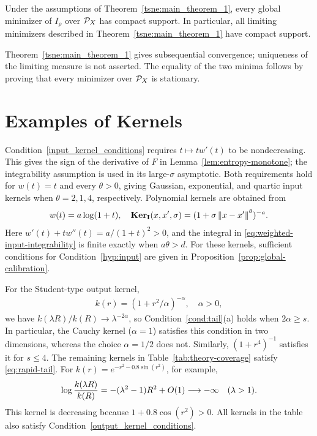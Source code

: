 \begin{theorem}\label{tsne:main_theorem_2}
Under the assumptions of Theorem~\ref{tsne:main_theorem_1}, every global minimizer of $I_\rho$ over $\mathcal P_X$ has compact support. In particular, all limiting minimizers described in Theorem~\ref{tsne:main_theorem_1} have compact support.
\end{theorem}
Theorem~\ref{tsne:main_theorem_1} gives subsequential convergence; uniqueness of the limiting measure is not asserted. The equality of the two minima follows by proving that every minimizer over $\mathcal P_X$ is stationary.

\section{Examples of Kernels}\label{tsne:sec:generality_conditions}
Condition~\ref{input_kernel_conditions} requires $t\mapsto tw'(t)$ to be nondecreasing. This gives the sign of the derivative of $F$ in Lemma~\ref{lem:entropy-monotone}; the integrability assumption is used in its large-$\sigma$ asymptotic. Both requirements hold for $w(t)=t$ and every $\theta>0$, giving Gaussian, exponential, and quartic input kernels when $\theta=2,1,4$, respectively. Polynomial kernels are obtained from
\begin{align}\label{eq:polynomial-example}
w(t)=a\log(1+t),\quad
\mathbf{Ker}_{\mathbf{I}}(x,x',\sigma)=(1+\sigma\left\lVert x-x'\right\rVert^\theta)^{-a}.
\end{align}
Here $w'(t)+tw''(t)=a/(1+t)^2>0$, and the integral in \eqref{eq:weighted-input-integrability} is finite exactly when $a\theta>d$. For these kernels, sufficient conditions for Condition~\ref{hyp:input} are given in Proposition~\ref{prop:global-calibration}.

For the Student-type output kernel,
\begin{align}\label{eq:student-tail}
k(r)=(1+r^2/\alpha)^{-\alpha},\quad \alpha>0,
\end{align}
we have $k(\lambda R)/k(R)\to\lambda^{-2\alpha}$, so Condition~\ref{cond:tail}(a) holds when $2\alpha\geq s$. In particular, the Cauchy kernel ($\alpha=1$) satisfies this condition in two dimensions, whereas the choice $\alpha=1/2$ does not. Similarly, $(1+r^4)^{-1}$ satisfies it for $s\leq4$. The remaining kernels in Table~\ref{tab:theory-coverage} satisfy \eqref{eq:rapid-tail}. For $k(r)=e^{-r^2-0.8\sin(r^2)}$, for example,
\begin{align}
\log\frac{k(\lambda R)}{k(R)}
=-(\lambda^2-1)R^2+O(1)\longrightarrow-\infty
\quad(\lambda>1).\notag
\end{align}
This kernel is decreasing because $1+0.8\cos(r^2)>0$. All kernels in the table also satisfy Condition~\ref{output_kernel_conditions}.

